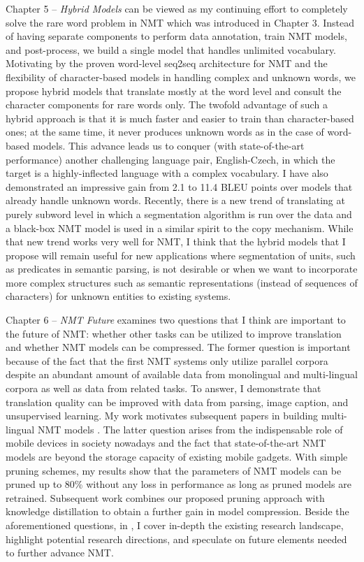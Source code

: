Chapter 5 -- {\it Hybrid Models} can be viewed as my continuing effort to completely solve the rare word problem in NMT which was introduced in Chapter 3.
Instead of having separate components to perform data annotation, train NMT models, and post-process, we build a single model that handles unlimited vocabulary. Motivating by the proven word-level seq2seq architecture for NMT and the flexibility of character-based models in handling complex and unknown words, we propose hybrid models that translate mostly at the word level and consult the character components for rare words only. The twofold advantage of such a hybrid approach is that it is much faster and easier to train than character-based ones; at the same time, it never produces unknown words as in the case of word-based models. This advance leads us to conquer (with state-of-the-art performance) another challenging language pair, English-Czech, in which the target is a highly-inflected language with a complex vocabulary. I have also demonstrated an impressive gain from 2.1 to 11.4 BLEU points over models that already handle unknown words. Recently, there is a new trend of translating at purely subword level \cite{sennrich16sub,gnmt16} in which a segmentation algorithm is run over the data and a black-box NMT model is used in a similar spirit to the copy mechanism. While that new trend works very well for NMT, I think that the hybrid models that I propose will remain useful for new applications where segmentation of units, such as predicates in semantic parsing, is not desirable or when we want to incorporate more complex structures such as semantic representations (instead of sequences of characters) for unknown entities to existing systems.

Chapter 6 -- {\it NMT Future} examines two questions that I think are important to the future of NMT: whether other tasks can be utilized to improve translation and whether NMT models can be compressed. The former question is important because of the fact that the first NMT systems only utilize parallel corpora despite an abundant amount of available data from monolingual and multi-lingual corpora as well as data from related tasks. To answer, 
I demonstrate that translation quality can be improved with data from parsing, image caption, and unsupervised learning. My work motivates subsequent papers in building multi-lingual NMT models \cite{zoph16,firat16,gnmt16multi,ha16}.
 The latter question arises from the indispensable role of mobile devices in society nowadays and the fact that state-of-the-art NMT models are beyond the storage capacity of existing mobile gadgets. With simple pruning schemes, my results show that the parameters of NMT models can be pruned up to 80\% without any loss in performance as long as pruned models are retrained. Subsequent work \cite{kim16distill} combines our proposed pruning approach with knowledge distillation to obtain a further gain in model compression. Beside the aforementioned questions, in , I cover in-depth the existing research landscape, highlight potential research directions, and speculate on future elements needed to further advance NMT.

